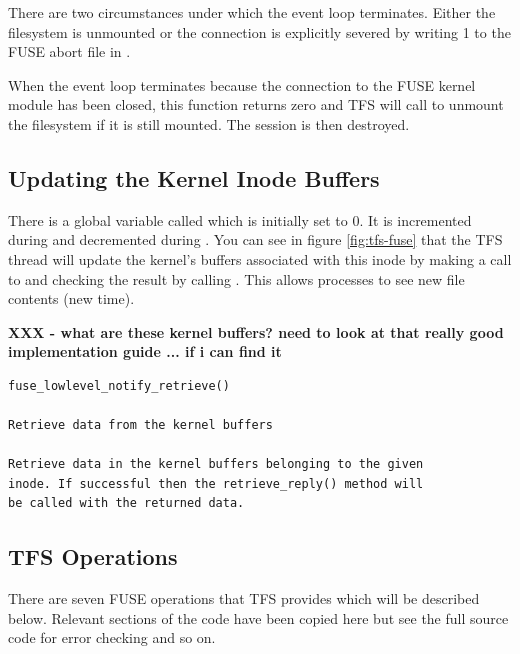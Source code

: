 \noindent
There are two circumstances under which the event loop terminates. Either the filesystem is unmounted or the connection is explicitly severed by writing 1 to the FUSE abort file in . 

When the event loop terminates because the connection to the FUSE kernel module has been closed, this function returns zero and TFS will call  to unmount the filesystem if it is still mounted. The session is then destroyed. 


\subsection{Updating the Kernel Inode Buffers}

There is a global variable called  which is initially set to 0. It is incremented during  and decremented during . You can see in figure \ref{fig:tfs-fuse} that the TFS thread will update the kernel's buffers associated with this inode by making a call to  and checking the result by calling . This allows processes to see new file contents (new time).

\textbf{XXX - what are these kernel buffers? need to look at that really good implementation guide ... if i can find it} 


\begin{lstlisting}
fuse_lowlevel_notify_retrieve()

Retrieve data from the kernel buffers

Retrieve data in the kernel buffers belonging to the given 
inode. If successful then the retrieve_reply() method will 
be called with the returned data.
\end{lstlisting}


\subsection{TFS Operations}

There are seven FUSE operations that TFS provides which will be described below. Relevant sections of the code have been copied here but see the full source code for error checking and so on.

